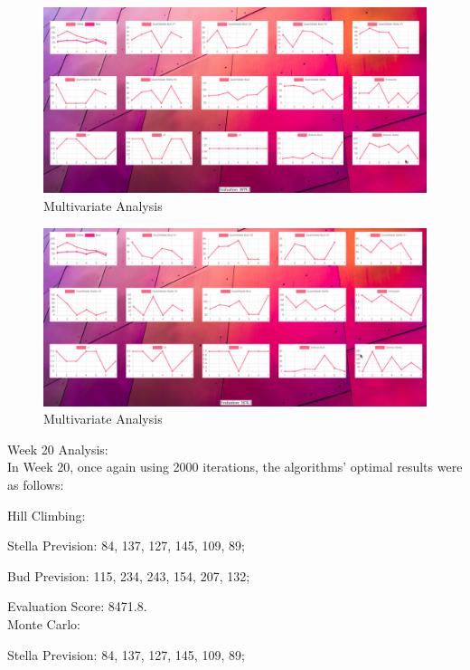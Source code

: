 \begin{figure}[H]
    \centering
    \includegraphics[width=1\textwidth]{assets/oo1.jpeg}
    \caption{Multivariate Analysis}
    \label{fig:mulivariate_dataset}
    \end{figure}


\begin{figure}[H]
    \centering
    \includegraphics[width=1\textwidth]{assets/oo2.jpeg}
    \caption{Multivariate Analysis}
    \label{fig:mulivariate_dataset}
    \end{figure}



Week 20 Analysis:\\

In Week 20, once again using 2000 iterations, the algorithms' optimal results were as follows:

\quad Hill Climbing:

\quad \quad \textbullet Stella Prevision: 84, 137, 127, 145, 109, 89;

\quad \quad \textbullet Bud Prevision: 115, 234, 243, 154, 207, 132;

\quad \quad \textbullet Evaluation Score: 8471.8.\\

\quad Monte Carlo:

\quad \quad \textbullet Stella Prevision: 84, 137, 127, 145, 109, 89;

